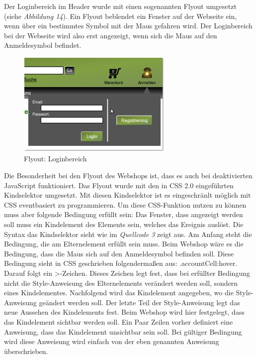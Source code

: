 Der Loginbereich im Header wurde mit einen sogenannten \glqq Flyout\grqq{} umgesetzt (siehe \textit{Abbildung 14}). Ein Flyout beblendet ein Fenster auf der Webseite ein, wenn über ein bestimmtes Symbol mit der Maus gefahren wird. Der Loginbereich bei der Webseite wird also erst angezeigt, wenn sich die Maus auf den Anmeldesymbol befindet. 

\begin{figure}[H]
	\begin{center}
			\includegraphics[width=75mm]{Bilder/Abbildung14_Loginbereich.png}
	\end{center}
	\caption{Flyout: Loginbereich}
	\label{fig:Abbildung 14}
\end{figure}

Die Besonderheit bei den Flyout des Webshops ist, dass es auch bei deaktivierten JavaScript funktioniert.  Das Flyout wurde mit den in CSS 2.0 eingeführten \glqq Kindselektor\grqq{} umgesetzt. Mit diesen \glqq Kindselektor\grqq{} ist es eingeschränlt möglich mit CSS eventbasiert zu programmieren. Um diese CSS-Funktion nutzen zu können muss aber folgende Bedingung erfüllt sein: Das Fenster, dass angezeigt werden soll muss ein Kindelement des Elements sein, welches das Ereignis auslöst. Die Syntax das \glqq Kindselektor\grqq{} sieht wie im \textit{Quellcode 3} zeigt aus. Am Anfang steht die Bedingung, die am Elternelement erfüllt sein muss. Beim Webshop wäre es die Bedingung, dass die Maus sich auf den Anmeldesymbol befinden soll. Diese Bedingung sieht in CSS geschrieben folgendermaßen aus: \glqq .accountCell:hover\grqq{}. Darauf folgt ein \glqq >\grqq{}-Zeichen. Dieses Zeichen legt fest, dass bei erfüllter Bedingung nicht die Style-Anweisung des Elternelements verändert werden soll, sondern eines Kindelementes. Nachfolgend wird das Kindelement angegeben, wo die Style-Anweisung geändert werden soll. Der letzte Teil der Style-Anweisung legt das neue Aussehen des Kindelements fest. Beim Webshop wird hier festgelegt, dass das Kindelement sichtbar werden soll. Ein Paar Zeilen vorher definiert eine Anweisung, dass das Kindelement unsichtbar sein soll. Bei gültiger Bedingung wird diese Anweisung wird einfach von der eben genannten Anweisung überschrieben.

